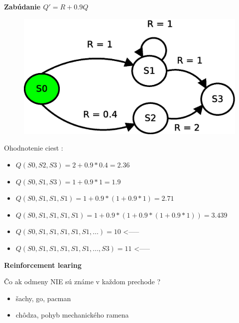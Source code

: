 \documentclass[xcolor=dvipsnames]{beamer}
\begin{document}
\begin{frame}{\bf Zabúdanie   $Q' = R + 0.9Q$}

  \begin{figure}[!htb]
  \centering
  \includegraphics[scale=.5]{../diagrams/rf_cycle_states.eps}
  \end{figure}

  Ohodnotenie ciest :
  \begin{itemize}
    \item $Q(S0, S2, S3) = 2 + 0.9*0.4 = 2.36$
    \item $Q(S0, S1, S3) = 1 + 0.9*1 = 1.9$
    \item $Q(S0, S1, S1, S1) = 1 + 0.9*(1 + 0.9*1) = 2.71 $
    \item $Q(S0, S1, S1, S1, S1) = 1 + 0.9*(1 + 0.9*(1 + 0.9*1)) = 3.439$
    \item $Q(S0, S1, S1, S1, S1, S1, ...) = 10$ <-----
    \item $Q(S0, S1, S1, S1, S1, S1, ..., S3) = 11$ <-----
  \end{itemize}

\end{frame}


\begin{frame}{\bf Reinforcement learing}

Čo ak odmeny NIE sú známe v každom prechode ?

\begin{itemize}
  \item šachy, go, pacman
  \item chôdza, pohyb mechanického ramena
\end{itemize}

\end{frame}
\end{document}
